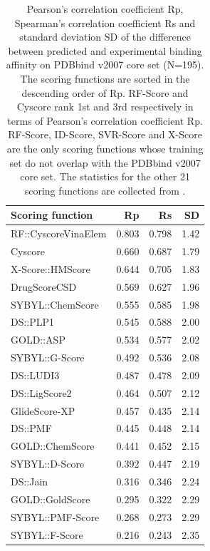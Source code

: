 \documentclass[journal=jacsat,manuscript=article]{achemso}
\begin{document}
\begin{table}
\caption{Pearson's correlation coefficient Rp, Spearman's correlation coefficient Rs and standard deviation SD of the difference between predicted and experimental binding affinity on PDBbind v2007 core set (N=195). The scoring functions are sorted in the descending order of Rp. RF-Score and Cyscore rank 1st and 3rd respectively in terms of Pearson's correlation coefficient Rp. RF-Score, ID-Score, SVR-Score and X-Score are the only scoring functions whose training set do not overlap with the PDBbind v2007 core set. The statistics for the other 21 scoring functions are collected from \cite{1313,1362,564,1305,1295}.}
\label{tbl:trn1105tst195}
\begin{tabular}{lrrr}
\hline
Scoring function & Rp & Rs & SD\\
\hline
RF::CyscoreVinaElem & 0.803 & 0.798 & 1.42\\
Cyscore & 0.660 & 0.687 & 1.79\\
X-Score::HMScore & 0.644 & 0.705 & 1.83\\
DrugScoreCSD & 0.569 & 0.627 & 1.96\\
SYBYL::ChemScore & 0.555 & 0.585 & 1.98\\
DS::PLP1 & 0.545 & 0.588 & 2.00\\
GOLD::ASP & 0.534 & 0.577 & 2.02\\
SYBYL::G-Score & 0.492 & 0.536 & 2.08\\
DS::LUDI3 & 0.487 & 0.478 & 2.09\\
DS::LigScore2 & 0.464 & 0.507 & 2.12\\
GlideScore-XP & 0.457 & 0.435 & 2.14\\
DS::PMF & 0.445 & 0.448 & 2.14\\
GOLD::ChemScore & 0.441 & 0.452 & 2.15\\
SYBYL::D-Score & 0.392 & 0.447 & 2.19\\
DS::Jain & 0.316 & 0.346 & 2.24\\
GOLD::GoldScore & 0.295 & 0.322 & 2.29\\
SYBYL::PMF-Score & 0.268 & 0.273 & 2.29\\
SYBYL::F-Score & 0.216 & 0.243 & 2.35\\
\hline
\end{tabular}
\end{table}
\end{document}
